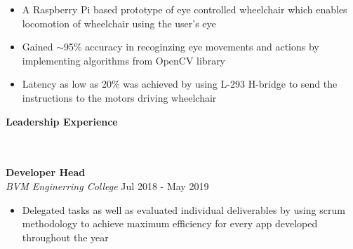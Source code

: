 \documentclass[]{article}
\newcommand{\lineunder} {
    \vspace*{-8pt} \\
    \hrulefill \\
}
\newcommand{\header} [1] {
    {\vspace*{6pt} \fontsize{12}{12}\selectfont \textbf{#1}}
     \lineunder
}
\begin{document}
\begin{itemize}
        \setlength\itemsep{0.2mm}
        \item A Raspberry Pi based prototype of eye controlled wheelchair which enables
        locomotion of wheelchair using the user's eye
        \item Gained $\sim$95\% accuracy in recoginzing eye movements and actions by implementing
        algorithms from OpenCV library
        \item Latency as low as 20\% was achieved by using L-293 H-bridge to send the instructions to
        the motors driving wheelchair
\end{itemize}

\header{Leadership Experience}
\hspace{1mm}
\textbf{Developer Head}\\ 
\hspace{1mm}
\textit{BVM Enginerring College} \hfill Jul 2018 - May 2019\\
\vspace{-2mm}
\begin{itemize}
	\setlength\itemsep{0.2mm}
		\item Delegated tasks as well as evaluated individual deliverables by using scrum methodology to achieve maximum efficiency for every app developed throughout the year
\end{itemize}
\vspace*{2mm}

\ 
\end{document}
